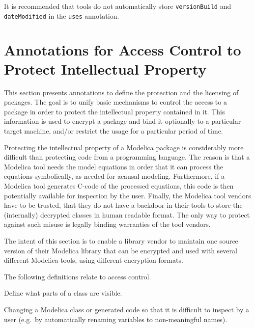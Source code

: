 \begin{nonnormative}
It is recommended that tools do not automatically store \lstinline!versionBuild! and \lstinline!dateModified! in the \lstinline!uses! annotation.
\end{nonnormative}

\section{Annotations for Access Control to Protect Intellectual Property}\label{annotations-for-access-control-to-protect-intellectual-property}

This section presents annotations to define the protection and the
licensing of packages. The goal is to unify basic mechanisms to control
the access to a package in order to protect the intellectual property
contained in it. This information is used to encrypt a package and bind
it optionally to a particular target machine, and/or restrict the usage
for a particular period of time.

\begin{nonnormative}
Protecting the intellectual property of a Modelica package is
considerably more difficult than protecting code from a programming
language. The reason is that a Modelica tool needs the model equations
in order that it can process the equations symbolically, as needed for
acausal modeling. Furthermore, if a Modelica tool generates C-code of
the processed equations, this code is then potentially available for
inspection by the user. Finally, the Modelica tool vendors have to be
trusted, that they do not have a backdoor in their tools to store the
(internally) decrypted classes in human readable format. The only way to
protect against such misuse is legally binding warranties of the tool
vendors.

The intent of this section is to enable a library vendor to
maintain one source version of their Modelica library that can be
encrypted and used with several different Modelica tools, using
different encryption formats.
\end{nonnormative}

The following definitions relate to access control.

\begin{definition}[Protection]
Define what parts of a class are visible.
\end{definition}

\begin{definition}[Obfuscation]
Changing a Modelica class or generated code so that it is difficult to inspect by a user (e.g.\ by automatically renaming variables to non-meaningful names).
\end{definition}

